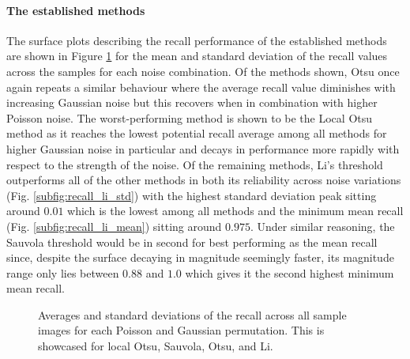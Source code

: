 \paragraph{The established methods}
The surface plots describing the recall performance of the established methods are shown in Figure \ref{fig:recall_thresh_surface} for the mean and standard deviation of the recall values across the samples for each noise combination. Of the methods shown, Otsu once again repeats a similar behaviour where the average recall value diminishes with increasing Gaussian noise but this recovers when in combination with higher Poisson noise. The worst-performing method is shown to be the Local Otsu method as it reaches the lowest potential recall average among all methods for higher Gaussian noise in particular and decays in performance more rapidly with respect to the strength of the noise. Of the remaining methods, Li's threshold outperforms all of the other methods in both its reliability across noise variations (Fig. \ref{subfig:recall_li_std}) with the highest standard deviation peak sitting around $0.01$ which is the lowest among all methods and the minimum mean recall (Fig. \ref{subfig:recall_li_mean}) sitting around $0.975$. Under similar reasoning, the Sauvola threshold would be in second for best performing as the mean recall since, despite the surface decaying in magnitude seemingly faster, its magnitude range only lies between $0.88$ and $1.0$ which gives it the second highest minimum mean recall.
\begin{figure}[h!]
    \centering
    \caption[Averages and standard deviations of the recall across all sample images for each Poisson and Gaussian permutation]{Averages and standard deviations of the recall across all sample images for each Poisson and Gaussian permutation. This is showcased for local Otsu, Sauvola, Otsu, and Li.}
    \label{fig:recall_thresh_surface}
\end{figure}
